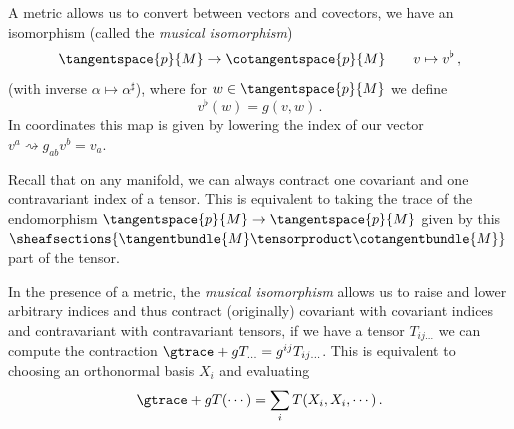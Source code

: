 \documentclass[titlepage,numbers=noenddot,oneside,%
cleardoublepage=empty,paper=a4,fontsize=11pt,%
english,%
]{scrartcl}
\newcommand*{\mathcomma}{\,,}
\newcommand*{\mathfullstop}{\,.}
\begin{document}
\begin{remark}
    A metric allows us to convert between vectors and covectors, \ie we have an isomorphism (called the \emph{musical isomorphism})
    \begin{equation*}
        \tangentspace{p}{M}\to \cotangentspace{p}{M}\qquad v\mapsto v^\flat\mathcomma
    \end{equation*}
    (with inverse \( \alpha\mapsto \alpha^{\sharp} \)), where for \( w\in \tangentspace{p}{M} \) we define
    \begin{equation*}
        v^{\flat}(w)=g(v,w)\mathfullstop
    \end{equation*}
    In coordinates this map is given by lowering the index of our vector \ie \( v^a\rightsquigarrow g_{ab}v^b=v_a \).
\end{remark}
\begin{remark}
    Recall that on any manifold, we can always contract one covariant and one contravariant index of a tensor. This is equivalent to taking the trace of the endomorphism \( \tangentspace{p}{M}\to \tangentspace{p}{M} \) given by this \( \sheafsections{\tangentbundle{M}\tensorproduct \cotangentbundle{M}} \) part of the tensor.
    
    In the presence of a metric, the \emph{musical isomorphism} allows us to raise and lower arbitrary indices and thus contract (originally) covariant with covariant indices and contravariant with contravariant tensors, \ie if we have a tensor \( T_{ij\dotsc} \) we can compute the contraction \( \gtrace+{g}{T}_{\dotsc}=g^{ij}T_{ij\dotsc} \). This is equivalent to choosing an orthonormal basis \( X_i \) and evaluating
    \begin{equation*}
        \gtrace+{g}{T}(\cdots)=\sum_{i}T(X_i,X_i,\cdots)\mathfullstop
    \end{equation*}
\end{remark}
\end{document}
